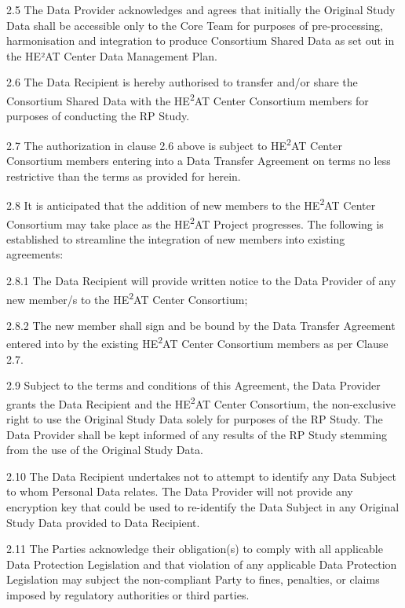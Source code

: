 2.5 The Data Provider acknowledges and agrees that initially the Original Study Data shall be accessible only to the Core  Team for purposes of pre-processing, harmonisation and integration to produce Consortium Shared Data as set out in the HE²AT Center Data Management Plan. 

2.6 The Data Recipient is hereby authorised to transfer and/or share the Consortium Shared Data with the HE\textsuperscript{2}AT Center Consortium members for purposes of conducting the RP Study.

2.7 The authorization in clause 2.6 above is subject to HE\textsuperscript{2}AT Center Consortium members entering into a Data Transfer Agreement on terms no less restrictive than the terms as provided for herein.

2.8 It is anticipated that the addition of new members to the HE\textsuperscript{2}AT Center Consortium may take place as the HE\textsuperscript{2}AT Project progresses. The following is established to streamline the integration of new members into existing agreements:

2.8.1 The Data Recipient will provide written notice to the Data Provider of any new member/s to the HE\textsuperscript{2}AT Center Consortium;

2.8.2 The new member shall sign and be bound by the Data Transfer Agreement entered into by the existing HE\textsuperscript{2}AT Center Consortium members as per Clause 2.7.

2.9 Subject to the terms and conditions of this Agreement, the Data Provider grants the Data Recipient and the HE\textsuperscript{2}AT Center Consortium, the non-exclusive right to use the Original Study Data solely for purposes of the RP Study. The Data Provider shall be kept informed of any results of the RP Study stemming from the use of the Original Study Data.

2.10 The Data Recipient undertakes not to attempt to identify any Data Subject to whom Personal Data relates. The Data Provider will not provide any encryption key that could be used to re-identify the Data Subject in any Original Study Data provided to Data Recipient.

2.11 The Parties acknowledge their obligation(s) to comply with all applicable Data Protection Legislation and that violation of any applicable Data Protection Legislation may subject the non-compliant Party to fines, penalties, or claims imposed by regulatory authorities or third parties.

